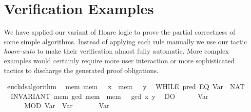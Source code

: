 \documentclass{llncs}
\begin{document}
\section{Verification Examples}

We have applied our variant of Hoare logic to prove the partial
correctness of some simple algorithms. Instead of applying each rule
manually we use our tactic \textit{hoare-auto} to make their
verification almost fully automatic. More complex examples would
certainly require more user interaction or more sophisticated tactics
to discharge the generated proof obligations.

\begin{isabellebody}
\isanewline
{}\isamarkupfalse%
\ euclids{}algorithm{}\isanewline
\ \ {}{}{}mem{}\ mem\ {}\ {}\ x\ {}\ mem\ {}\ {}\ y{}{}\isanewline
\ \ WHILE\ {}{}pred\ {}EQ\ {}Var\ {}{}\ {}NAT\ {}{}{}{}\isanewline
\ \ INVARIANT\ {}mem{}\ gcd\ {}mem\ {}{}\ {}mem\ {}{}\ {}\ gcd\ x\ y{}\isanewline
\ \ DO\isanewline
\ \ \ \ {}\ {}{}\ Var\ {}{}\isanewline
\ \ \ \ {}\ {}{}\ MOD\ {}Var\ {}{}\ {}Var\ {}{}{}\isanewline
\ \ \ \ {}\ {}{}\ Var\ {}\isanewline

\end{isabellebody}
\end{document}
